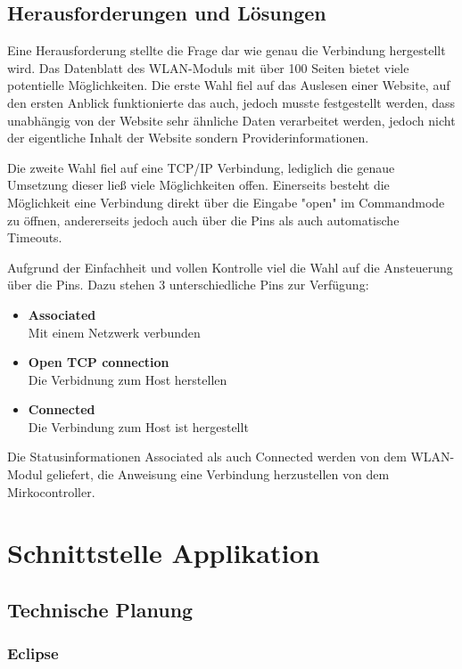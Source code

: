   \subsection{Herausforderungen und Lösungen}
  Eine Herausforderung stellte die Frage dar wie genau die Verbindung hergestellt wird. Das Datenblatt des WLAN-Moduls mit über 100 Seiten bietet viele potentielle Möglichkeiten.
  Die erste Wahl fiel auf das Auslesen einer Website, auf den ersten Anblick funktionierte das auch, jedoch musste festgestellt werden, dass unabhängig von der Website sehr ähnliche
  Daten verarbeitet werden, jedoch nicht der eigentliche Inhalt der Website sondern Providerinformationen.

  Die zweite Wahl fiel auf eine TCP/IP Verbindung, lediglich die genaue Umsetzung dieser ließ viele Möglichkeiten offen. Einerseits besteht die Möglichkeit eine Verbindung direkt
  über die Eingabe "open" im Commandmode zu öffnen, andererseits jedoch auch über die Pins als auch automatische Timeouts.

  Aufgrund der Einfachheit und vollen Kontrolle viel die Wahl auf die Ansteuerung über die Pins.
  Dazu stehen 3 unterschiedliche Pins zur Verfügung:
  \begin{itemize}
    \item \textbf{Associated}\\
    Mit einem Netzwerk verbunden
    \item \textbf{Open TCP connection}\\
    Die Verbidnung zum Host herstellen
    \item \textbf{Connected}\\
    Die Verbindung zum Host ist hergestellt
  \end{itemize}
  Die Statusinformationen Associated als auch Connected werden von dem WLAN-Modul geliefert, die Anweisung eine Verbindung herzustellen von dem Mirkocontroller.

\section{Schnittstelle Applikation}

  \subsection{Technische Planung}

      \subsubsection{Eclipse}

